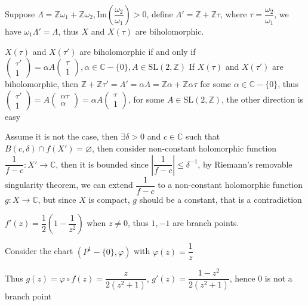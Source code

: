 \documentclass[../main.tex]{subfiles}
\begin{document}
\begin{problem}
Suppose $\Lambda=\mathbb{Z}\omega_{1}+\mathbb{Z}\omega_{2}, \mathrm{Im}\left(\dfrac{\omega_{2}}{\omega_{1}}\right)>0$, define $\Lambda'=\mathbb{Z}+\mathbb{Z}\tau$, where $\tau=\dfrac{\omega_{2}}{\omega_{1}}$, we have $\omega_{1}\Lambda'=\Lambda$, thus $X$ and $X(\tau)$ are biholomorphic. \par
$X(\tau)$ and $X(\tau')$ are biholomorphic if and only if $\begin{pmatrix}
\tau'\\ 
1
\end{pmatrix}
=\alpha A
\begin{pmatrix}
\tau\\ 
1
\end{pmatrix}, \alpha\in \mathbb{C}-\{0\}, A\in \mathrm{SL}(2,\mathbb{Z})$
If $X(\tau)$ and $X(\tau')$ are biholomorphic, then $\mathbb{Z}+\mathbb{Z}\tau'=\Lambda'=\alpha\Lambda=\mathbb{Z}\alpha+\mathbb{Z}\alpha\tau$ for some $\alpha\in \mathbb{C}-\{0\}$, thus $\begin{pmatrix}
\tau'\\ 
1
\end{pmatrix}
=
A
\begin{pmatrix}
\alpha\tau\\ 
\alpha
\end{pmatrix}
=\alpha A
\begin{pmatrix}
\tau\\ 
1
\end{pmatrix}$, for some $A\in \mathrm{SL}(2,\mathbb{Z})$, the other direction is easy
\end{problem}

\begin{problem}
Assume it is not the case, then $\exists \delta>0$ and $c\in\mathbb{C}$ such that $B(c,\delta) \cap f(X') = \varnothing$, then consider non-constant holomorphic function $\dfrac{1}{f-c}:X'\rightarrow \mathbb{C}$, then it is bounded since $\left| \dfrac{1}{f-c} \right| \leq \delta^{-1}$, by Riemann's removable singularity theorem, we can extend \(\dfrac{1}{f-c}\) to a non-constant holomorphic function $g:X\rightarrow \mathbb{C}$, but since $X$ is compact, $g$ should be a constant, that is a contradiction
\end{problem}

\begin{problem}
$f'(z)=\dfrac{1}{2}\left(1-\dfrac{1}{z^{2}}\right)$ when $z\neq0$, thus $1,-1$ are branch points. \par
Consider the chart $({P}^{1}-\{0\},\varphi)$ with $\varphi(z)=\dfrac{1}{z}$

\begin{center}
\end{center}

Thus $g(z)=\varphi\circ f(z)=\dfrac{z}{2(z^{2}+1)}$, $g'(z)=\dfrac{1-z^{2}}{2(z^{2}+1)}$, hence \(0\) is not a branch point
\end{problem}
\end{document}
